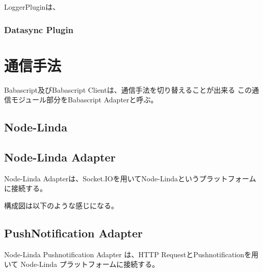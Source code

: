 LoggerPluginは、

\subsubsection{Datasync Plugin}\label{datasync-plugin}

\section{通信手法}\label{ux901aux4fe1ux624bux6cd5}

Babascript及びBabascript Clientは、通信手法を切り替えることが出来る
この通信モジュール部分をBabascript Adapterと呼ぶ。

\subsection{Node-Linda}\label{node-linda}

\subsection{Node-Linda Adapter}\label{node-linda-adapter}

Node-Linda
Adapterは、Socket.IOを用いてNode-Lindaというプラットフォームに接続する。

構成図は以下のような感じになる。

\subsection{PushNotification Adapter}\label{pushnotification-adapter}

Node-Linda Pushnotification Adapter は、HTTP
RequestとPushnotificationを用いて Node-Linda
プラットフォームに接続する。
